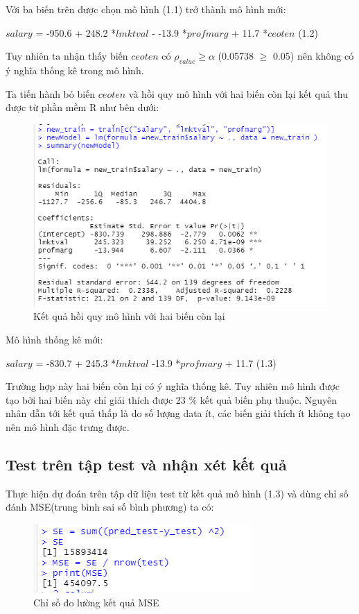 \documentclass[a4paper]{article}
\begin{document}
Với ba biến trên được chọn mô hình (1.1) trở thành mô hình mới:

$\textit{salary}$ = -950.6 + 248.2 *$\textit{lmktval}$ - -13.9 *$\textit{profmarg}$ + 11.7  *$\textit{ceoten}$  (1.2)

Tuy nhiên ta nhận thấy biến $\textit{ceoten}$ có $\rho_{value} \ge \alpha$ (0.05738 $\ge$ 0.05) nên không có ý nghĩa thống kê trong mô hình.

Ta tiến hành bỏ biến $\textit{ceoten}$ và hồi quy mô hình với hai biến còn lại kết quả thu được từ phần mềm R như bên dưới:

\begin{figure}[h!]
	\centering
	\includegraphics[scale = 0.52]{../Photo Of Result/B1_newsummary.PNG}  
	\caption{Kết quả hồi quy mô hình với hai biến còn lại}
	\label{ex1:model:1}
\end{figure}

Mô hình thống kê mới:

$\textit{salary}$ = -830.7 + 245.3 *$\textit{lmktval}$ -13.9 *$\textit{profmarg}$ + 11.7  (1.3)


Trường hợp này hai biến còn lại có ý nghĩa thống kê. Tuy nhiên mô hình được tạo bởi hai biến này chỉ giải thích được 23 $\%$ kết quả biến phụ thuộc. Nguyên nhân dẫn tới kết quả thấp là do số lượng data ít, các biến giải thích ít không tạo nên mô hình đặc trưng được.



\subsection*{Test trên tập test và nhận xét kết quả}

Thực hiện dự đoán trên tập dữ liệu test từ kết quả mô hình (1.3)  và dùng chỉ số đánh MSE(trung bình sai số bình phương) ta có:

\begin{figure}[h!]
	\centering
	\includegraphics[scale = 0.5]{../Photo Of Result/B1_MSE.PNG}  
	\caption{Chỉ số đo lường kết quả MSE}
	\label{ex1:model:1}
\end{figure}
\end{document}
